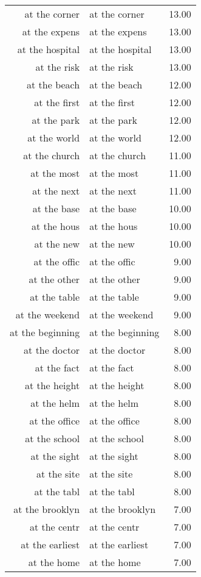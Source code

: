 \begin{table}[ht]
\begin{tabular}{rlr}
  at the corner & at the corner & 13.00 \\ 
  at the expens & at the expens & 13.00 \\ 
  at the hospital & at the hospital & 13.00 \\ 
  at the risk & at the risk & 13.00 \\ 
  at the beach & at the beach & 12.00 \\ 
  at the first & at the first & 12.00 \\ 
  at the park & at the park & 12.00 \\ 
  at the world & at the world & 12.00 \\ 
  at the church & at the church & 11.00 \\ 
  at the most & at the most & 11.00 \\ 
  at the next & at the next & 11.00 \\ 
  at the base & at the base & 10.00 \\ 
  at the hous & at the hous & 10.00 \\ 
  at the new & at the new & 10.00 \\ 
  at the offic & at the offic & 9.00 \\ 
  at the other & at the other & 9.00 \\ 
  at the table & at the table & 9.00 \\ 
  at the weekend & at the weekend & 9.00 \\ 
  at the beginning & at the beginning & 8.00 \\ 
  at the doctor & at the doctor & 8.00 \\ 
  at the fact & at the fact & 8.00 \\ 
  at the height & at the height & 8.00 \\ 
  at the helm & at the helm & 8.00 \\ 
  at the office & at the office & 8.00 \\ 
  at the school & at the school & 8.00 \\ 
  at the sight & at the sight & 8.00 \\ 
  at the site & at the site & 8.00 \\ 
  at the tabl & at the tabl & 8.00 \\ 
  at the brooklyn & at the brooklyn & 7.00 \\ 
  at the centr & at the centr & 7.00 \\ 
  at the earliest & at the earliest & 7.00 \\ 
  at the home & at the home & 7.00 \\ 

\end{tabular}
\end{table}
